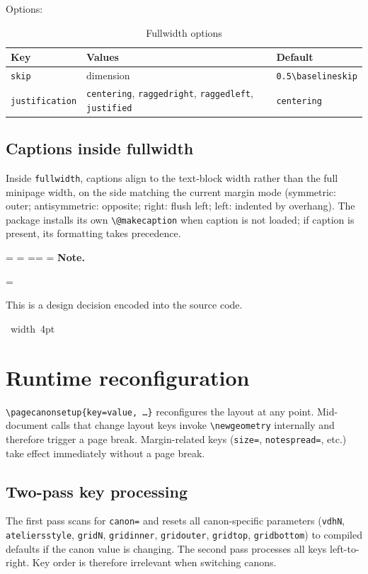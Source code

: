 \documentclass[11pt, twoside, openany]{book}
\makeatletter
\newcommand{\pkg}[1]{\textsf{#1}}
\newcommand{\cmd}[1]{\texttt{\textbackslash #1}}
\newcommand*{\cns@tag@artifact@begin}{}
\newcommand*{\cns@tag@artifact@end}{}
\newenvironment{TodoNote}[1][]{%
  \par\addvspace{0.5\baselineskip plus 2pt}%
  \setbox\cns@box=\vbox\bgroup
    \hsize=\linewidth
    \advance\hsize -10pt
    \linewidth=\hsize \columnwidth=\hsize
    \parindent=\z@
    \noindent\textbf{\sffamily Note\cns@ifnotempty{#1}{ \textmd{(#1)}}.}%
    \par\nobreak
    \@afterindentfalse\@afterheading
    \leftskip=\cns@indent\relax
    \ignorespaces
}{%
  \par
  \egroup
  \vbox{\hbox{%
    \cns@tag@artifact@begin\vrule width 4pt\cns@tag@artifact@end
    \hskip 6pt\relax
    \box\cns@box
  }}%
  \par\addvspace{0.5\baselineskip plus 2pt}%
}
\makeatother
\begin{document}
Options:
\begin{table}[h]
	\centering
	\caption{Fullwidth options}
	\label{tab:fullopts}
	\begin{tabular}{lll}
		\textbf{Key}  & \textbf{Values} & \textbf{Default}               \\
		\hline
		\texttt{skip} & dimension       & \texttt{0.5\cmd{baselineskip}} \\
		\texttt{justification} & \texttt{centering}, \texttt{raggedright},
		\texttt{raggedleft}, \texttt{justified}
		& \texttt{centering} \\
	\end{tabular}
\end{table}

\section{Captions inside fullwidth}\label{sec:captions}

Inside \texttt{fullwidth}, captions align to the text-block width rather than the full minipage width, on the side matching the current margin mode (symmetric: outer; antisymmetric: opposite; right: flush left; left: indented by overhang). The package installs its own \cmd{@makecaption} when \pkg{caption} is not loaded; if \pkg{caption} is present, its formatting takes precedence.

\begin{TodoNote}
	This is a design decision encoded into the source code.
\end{TodoNote}


\chapter{Runtime reconfiguration}\label{chapter:reconfiguration}

\cmd{pagecanonsetup}\texttt{\{key=value, \ldots\}} reconfigures the layout at any point. Mid-document calls that change layout keys invoke \cmd{newgeometry} internally and therefore trigger a page break. Margin-related keys (\texttt{size=}, \texttt{notespread=}, etc.) take effect immediately without a page break.

\section{Two-pass key processing}\label{sec:twopass}

The first pass scans for \texttt{canon=} and resets all canon-specific parameters (\texttt{vdhN}, \texttt{ateliersstyle}, \texttt{gridN}, \texttt{gridinner}, \texttt{gridouter}, \texttt{gridtop}, \texttt{gridbottom}) to compiled defaults if the canon value is changing. The second pass processes all keys left-to-right. Key order is therefore irrelevant when switching canons.
\end{document}
